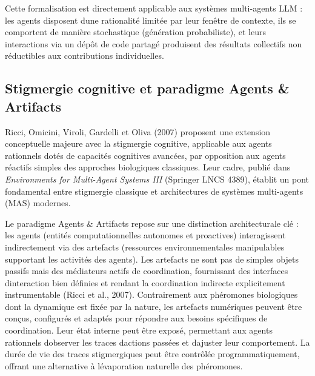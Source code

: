\documentclass[12pt,a4paper]{article}
\begin{document}
Cette formalisation est directement applicable aux systèmes multi-agents
LLM : les agents disposent d\textquotesingle une rationalité limitée par
leur fenêtre de contexte, ils se comportent de manière stochastique
(génération probabiliste), et leurs interactions via un dépôt de code
partagé produisent des résultats collectifs non réductibles aux
contributions individuelles.

\subsection{Stigmergie cognitive et paradigme Agents \&
Artifacts}\label{stigmergie-cognitive-et-paradigme-agents--artifacts}

Ricci, Omicini, Viroli, Gardelli et Oliva (2007) proposent une extension
conceptuelle majeure avec la stigmergie cognitive, applicable aux agents
rationnels dotés de capacités cognitives avancées, par opposition aux
agents réactifs simples des approches biologiques classiques. Leur
cadre, publié dans \emph{Environments for Multi-Agent Systems III}
(Springer LNCS 4389), établit un pont fondamental entre stigmergie
classique et architectures de systèmes multi-agents (MAS) modernes.

Le paradigme Agents \& Artifacts repose sur une distinction
architecturale clé : les agents (entités computationnelles autonomes et
proactives) interagissent indirectement via des artefacts (ressources
environnementales manipulables supportant les activités des agents). Les
artefacts ne sont pas de simples objets passifs mais des médiateurs
actifs de coordination, fournissant des interfaces
d\textquotesingle interaction bien définies et rendant la coordination
indirecte explicitement instrumentable (Ricci et al., 2007).
Contrairement aux phéromones biologiques dont la dynamique est fixée par
la nature, les artefacts numériques peuvent être conçus, configurés et
adaptés pour répondre aux besoins spécifiques de coordination. Leur état
interne peut être exposé, permettant aux agents rationnels
d\textquotesingle observer les traces d\textquotesingle actions passées
et d\textquotesingle ajuster leur comportement. La durée de vie des
traces stigmergiques peut être contrôlée programmatiquement, offrant une
alternative à l\textquotesingle évaporation naturelle des phéromones.
\end{document}

